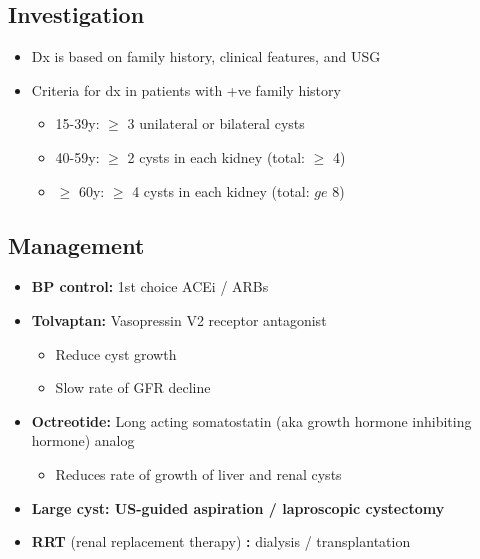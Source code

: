 \documentclass[
  12pt,
]{memoir}
\providecommand{\tightlist}{%
  \setlength{\itemsep}{0pt}\setlength{\parskip}{0pt}}
\begin{document}
\hypertarget{investigation-24}{%
\subsection{Investigation}\label{investigation-24}}

\begin{itemize}
\tightlist
\item
  Dx is based on family history, clinical features, and USG
\item
  Criteria for dx in patients with +ve family history

  \begin{itemize}
  \tightlist
  \item
    15-39y: \(\ge\) 3 unilateral or bilateral cysts
  \item
    40-59y: \(\ge\) 2 cysts in each kidney (total: \(\ge\) 4)
  \item
    \(\ge\) 60y: \(\ge\) 4 cysts in each kidney (total: \(ge\) 8)
  \end{itemize}
\end{itemize}

\hypertarget{management-16}{%
\subsection{Management}\label{management-16}}

\begin{itemize}
\tightlist
\item
  \textbf{BP control:} 1st choice ACEi / ARBs
\item
  \textbf{Tolvaptan:} Vasopressin V2 receptor antagonist

  \begin{itemize}
  \tightlist
  \item
    Reduce cyst growth
  \item
    Slow rate of GFR decline
  \end{itemize}
\item
  \textbf{Octreotide:} Long acting somatostatin (aka growth hormone
  inhibiting hormone) analog

  \begin{itemize}
  \tightlist
  \item
    Reduces rate of growth of liver and renal cysts
  \end{itemize}
\item
  \textbf{Large cyst: US-guided aspiration / laproscopic cystectomy}
\item
  \textbf{RRT} (renal replacement therapy) \textbf{:} dialysis /
  transplantation
\end{itemize}
\end{document}
